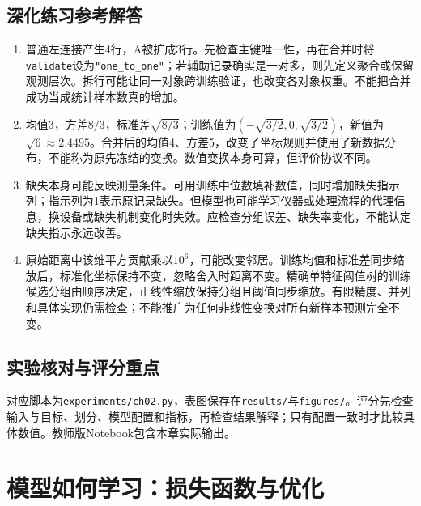 \section*{深化练习参考解答}
\begin{enumerate}[label=D\arabic*.]
\item 普通左连接产生4行，A被扩成3行。先检查主键唯一性，再在合并时将\texttt{validate}设为\texttt{"one\_to\_one"}；若辅助记录确实是一对多，则先定义聚合或保留观测层次。拆行可能让同一对象跨训练验证，也改变各对象权重。不能把合并成功当成统计样本数真的增加。
\item 均值3，方差$8/3$，标准差$\sqrt{8/3}$；训练值为$(-\sqrt{3/2},0,\sqrt{3/2})$，新值为$\sqrt6\approx2.4495$。合并后的均值4、方差5，改变了坐标规则并使用了新数据分布，不能称为原先冻结的变换。数值变换本身可算，但评价协议不同。
\item 缺失本身可能反映测量条件。可用训练中位数填补数值，同时增加缺失指示列；指示列为1表示原记录缺失。但模型也可能学习仪器或处理流程的代理信息，换设备或缺失机制变化时失效。应检查分组误差、缺失率变化，不能认定缺失指示永远改善。
\item 原始距离中该维平方贡献乘以$10^6$，可能改变邻居。训练均值和标准差同步缩放后，标准化坐标保持不变，忽略舍入时距离不变。精确单特征阈值树的训练候选分组由顺序决定，正线性缩放保持分组且阈值同步缩放。有限精度、并列和具体实现仍需检查；不能推广为任何非线性变换对所有新样本预测完全不变。
\end{enumerate}

\section*{实验核对与评分重点}
对应脚本为\texttt{experiments/ch02.py}，表图保存在\texttt{results/}与\texttt{figures/}。评分先检查输入与目标、划分、模型配置和指标，再检查结果解释；只有配置一致时才比较具体数值。教师版Notebook包含本章实际输出。

\chapter{模型如何学习：损失函数与优化}
